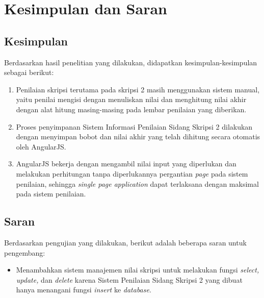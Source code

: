 \chapter{Kesimpulan dan Saran}
\label{chap: kesimpulan}

\section{Kesimpulan}
\label{sec: kesimpulan}
	
	Berdasarkan hasil penelitian yang dilakukan, didapatkan kesimpulan-kesimpulan sebagai berikut:
	\begin{enumerate}
		\item Penilaian skripsi terutama pada skripsi 2 masih menggunakan sistem manual, yaitu penilai mengisi dengan menuliskan nilai dan menghitung nilai akhir dengan alat hitung masing-masing pada lembar penilaian yang diberikan.
		\item Proses penyimpanan Sistem Informasi Penilaian Sidang Skripsi 2 dilakukan dengan menyimpan bobot dan nilai akhir yang telah dihitung secara otomatis oleh AngularJS.
		\item AngularJS bekerja dengan mengambil nilai input yang diperlukan dan melakukan perhitungan tanpa diperlukannya pergantian \textit{page} pada sistem penilaian, sehingga \textit{single page application} dapat terlaksana dengan maksimal pada sistem penilaian.
	\end{enumerate}

\section{Saran}
\label{sec: saran}

	Berdasarkan pengujian yang dilakukan, berikut adalah beberapa saran untuk pengembang:
	\begin{itemize}
		\item Menambahkan sistem manajemen nilai skripsi untuk melakukan fungsi \textit{select, update,} dan \textit{delete} karena Sistem Penilaian Sidang Skripsi 2 yang dibuat hanya menangani fungsi \textit{insert} ke \textit{database}.
	\end{itemize}
	